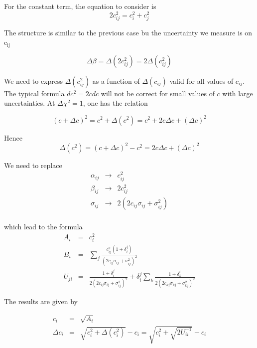 For the constant term, the equation to consider is
\begin{equation}
2c_{ij}^2 = c_i^2 + c_j^2
\end{equation}

The structure is similar to the previous case bu the uncertainty we measure is on c\(_{\text{ij}}\)

\begin{equation}
\Delta \beta = \Delta(2c_{ij}^2)  = 2\Delta(c_{ij}^2)
\end{equation}

We need to express \(\Delta(c_{ij}^2)\) as a function of \(\Delta(c_{ij})\) valid for all values of \(c_{ij}\).
The typical formula \(dc^2=2cdc\) will not be correct for small values of \(c\) with large uncertainties.
At \(\Delta\chi^2=1\), one has the relation

\begin{equation}
(c+\Delta c)^2 = c^2 + \Delta(c^2) = c^2 + 2c\Delta c + (\Delta c)^2
\end{equation}

Hence
\begin{equation}
\Delta(c^2) = (c+\Delta c)^2 - c^2 = 2c\Delta c + (\Delta c)^2
\end{equation}

We need to replace
\begin{equation}
\begin{array}{lcl}
\alpha_{ij} &\rightarrow & c_{ij}^2 \\
\beta_{ij}&\rightarrow & 2c_{ij}^2 \\
\sigma_{ij} &\rightarrow & 2 (2c_{ij}\sigma_{ij} + \sigma_{ij}^2) \\
\end{array}
\end{equation}


which lead to the formula
\begin{equation}
\begin{array}{lcl}
A_i &=& c_i^2\\
B_i &=& \sum\limits_j \frac{c_{ij}^2(1+\delta_i^j)}{(2c_{ij}\sigma_{ij} + \sigma_{ij}^2)^2} \\
U_{ji} &= &\frac{1+\delta_i^j}{2(2c_{ij}\sigma_{ij} + \sigma_{ij}^2)^2} + \delta_i^j\sum\limits_k \frac{1+\delta_k^i}{2(2c_{kj}\sigma_{kj} + \sigma_{kj}^2)^2}
\end{array}
\end{equation}

The results are given by

\begin{equation}
\begin{array}{lcl}
c_i &=& \sqrt{A_i} \\
\Delta c_i &=& \sqrt{c_i^2 + \Delta(c_i^2) } -c_i = \sqrt{c_i^2 + \sqrt{2U_{ii}^{-1}}} - c_i
\end{array}
\end{equation}
